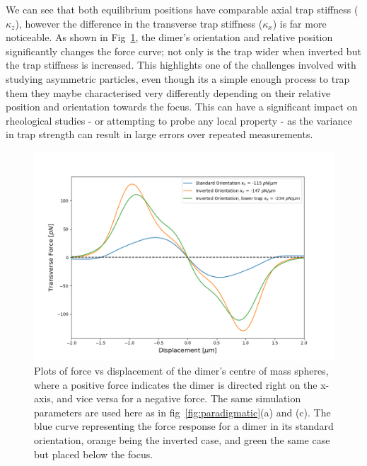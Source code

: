 We can see that both equilibrium positions have comparable axial trap stiffness 
($\kappa_z$), however the difference in the transverse trap stiffness ($\kappa_x$) 
is far more noticeable. As shown in Fig~\ref{fig:transverse_force}, 
the dimer's orientation and relative position significantly changes the force 
curve; not only is the trap wider when inverted but the trap stiffness is 
increased. This highlights one of the challenges involved with studying 
asymmetric particles, even though its a simple enough process to trap them 
they maybe characterised very differently depending on their relative position 
and orientation towards the focus. This can have a significant impact on 
rheological studies - or attempting to probe any local property - as the 
variance in trap strength can result in large errors over repeated measurements. 
\begin{figure}[h!]
	\centering
	\includegraphics[width=\linewidth]{transverse_force.png}
	\caption{Plots of force vs displacement of the dimer's centre of mass spheres, 
		where a positive force indicates the dimer is directed right on the x-axis, 
		and vice versa for a negative force. The same simulation parameters are used here as in fig~\ref{fig:paradigmatic}(a) and (c). The blue curve representing the force response for a dimer in its standard orientation, orange being the inverted case, and green the same case but placed below the focus.}
	\label{fig:transverse_force}
\end{figure}


